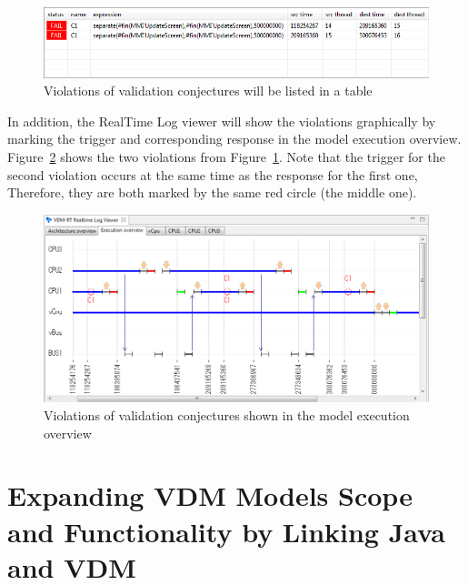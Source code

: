 \documentclass{overturerepchap}
\begin{document}
\begin{figure}[htp]
\begin{center}
  \includegraphics[width=6.5in]{screenDumps/listedConjecturesViolated}
  \caption{Violations of validation conjectures will be listed in a table}
  \label{fig:userguide:listedConjecturesViolated}
\end{center}
\end{figure}

In addition, the RealTime Log viewer will show the violations graphically by
marking the trigger and corresponding response in the model execution overview.
Figure~\ref{fig:userguide:markedConjecturesViolated} shows the two violations
from Figure~\ref{fig:userguide:listedConjecturesViolated}. Note that the trigger
for the second violation occurs at the same time as the response for the first one,
Therefore, they are both marked by the same red circle (the middle one).

\begin{figure}[htp]
\begin{center}
  \includegraphics[width=5in]{screenDumps/markedConjecturesViolated}
  \caption{Violations of validation conjectures shown in the model execution overview}
  \label{fig:userguide:markedConjecturesViolated}
\end{center}
\end{figure}






\chapter{Expanding VDM Models Scope and Functionality by Linking Java and VDM} \label{sec:linkToJava}
\end{document}
